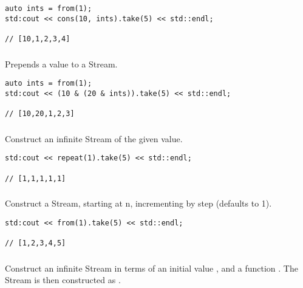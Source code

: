 \begin{lstlisting}[title=example]
auto ints = from(1);
std:cout << cons(10, ints).take(5) << std::endl;

// [10,1,2,3,4]
\end{lstlisting}

\subsubsection{}

Prepends a value to a Stream.

\begin{lstlisting}[title=example]
auto ints = from(1);
std:cout << (10 & (20 & ints)).take(5) << std::endl;

// [10,20,1,2,3]
\end{lstlisting}

\subsubsection{}

Construct an infinite Stream of the given value.

\begin{lstlisting}[title=example]
std:cout << repeat(1).take(5) << std::endl;

// [1,1,1,1,1]
\end{lstlisting}


\subsubsection{}

Construct a Stream, starting at n, incrementing by step (defaults to 1).

\begin{lstlisting}[title=example]
std:cout << from(1).take(5) << std::endl;

// [1,2,3,4,5]
\end{lstlisting}

\subsubsection{}

Construct an infinite Stream in terms of an initial value , and a function .
The Stream is then constructed as .

